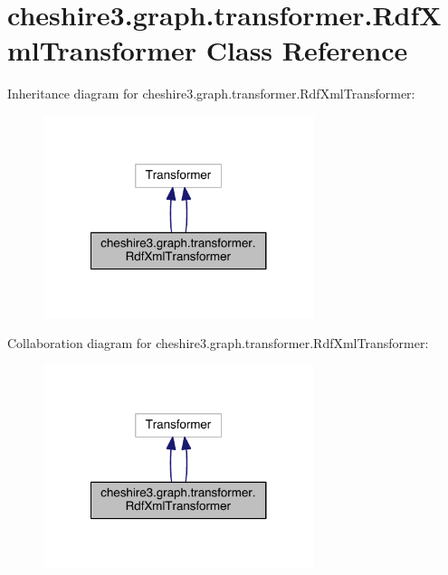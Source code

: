 \hypertarget{classcheshire3_1_1graph_1_1transformer_1_1_rdf_xml_transformer}{\section{cheshire3.\-graph.\-transformer.\-Rdf\-Xml\-Transformer Class Reference}
\label{classcheshire3_1_1graph_1_1transformer_1_1_rdf_xml_transformer}
}


Inheritance diagram for cheshire3.\-graph.\-transformer.\-Rdf\-Xml\-Transformer\-:
\nopagebreak
\begin{figure}[H]
\begin{center}
\leavevmode
\includegraphics[width=224pt]{classcheshire3_1_1graph_1_1transformer_1_1_rdf_xml_transformer__inherit__graph}
\end{center}
\end{figure}


Collaboration diagram for cheshire3.\-graph.\-transformer.\-Rdf\-Xml\-Transformer\-:
\nopagebreak
\begin{figure}[H]
\begin{center}
\leavevmode
\includegraphics[width=224pt]{classcheshire3_1_1graph_1_1transformer_1_1_rdf_xml_transformer__coll__graph}
\end{center}
\end{figure}
